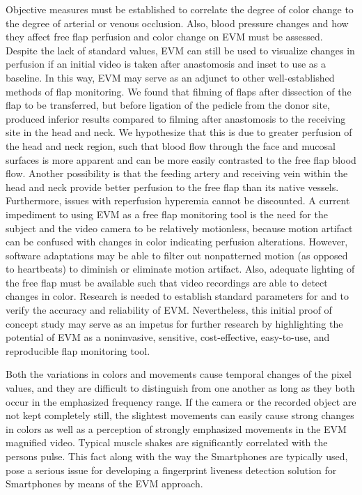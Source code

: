 
Objective measures must be established to correlate the degree of color change to the degree of arterial or venous occlusion. Also, blood pressure changes and how they affect free flap perfusion and color change on EVM must be assessed. Despite the lack of standard values, EVM can still be used to visualize changes in perfusion if an initial video is taken after anastomosis and inset to use as a baseline. In this way, EVM may serve as an adjunct to other well-established methods of flap monitoring.
We found that filming of flaps after dissection of the flap to be transferred, but before ligation of the pedicle from the donor site, produced inferior results compared to filming after anastomosis to the receiving site in the head and neck. We hypothesize that this is due to greater perfusion of the head and neck region, such that blood flow through the face and mucosal surfaces is more apparent and can be more easily contrasted to the free flap blood flow. Another possibility is that the feeding artery and receiving vein within the head and neck provide better perfusion to the free flap than its native vessels. Furthermore, issues with reperfusion hyperemia cannot be discounted.
A current impediment to using EVM as a free flap monitoring tool is the need for the subject and the video camera to be relatively motionless, because motion artifact can be confused with changes in color indicating perfusion alterations. However, software adaptations may be able to filter out nonpatterned motion (as opposed to heartbeats) to diminish or eliminate motion artifact. Also, adequate lighting of the free flap must be available such that video recordings are able to detect changes in color. Research is needed to establish standard parameters for and to verify the accuracy and reliability of EVM. Nevertheless, this initial proof of concept study may serve as an impetus for further research by highlighting the potential of EVM as a noninvasive, sensitive, cost-effective, easy-to-use, and reproducible flap monitoring tool.


Both the variations in colors and movements cause temporal changes of the pixel values, and they are difficult to distinguish from one another as long as they both occur in the emphasized frequency range. If the camera or the recorded object are not kept completely still, the slightest movements can easily cause strong changes in colors as well as a perception of strongly emphasized movements in the EVM magnified video. Typical muscle shakes are significantly correlated with the persons pulse. This fact along with the way the Smartphones are typically used, pose a serious issue for developing a fingerprint liveness detection solution for Smartphones by means of the EVM approach.\\







